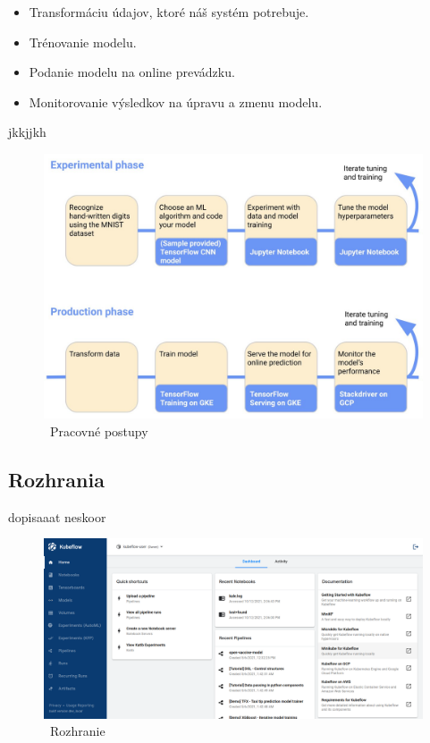 \begin{itemize}
    \item Transformáciu údajov, ktoré náš systém potrebuje.
	\item Trénovanie modelu.
	\item Podanie modelu na online prevádzku.
	\item Monitorovanie výsledkov na úpravu a zmenu modelu.
\end{itemize}
jkkjjkh
\begin{figure}[!ht]
    \includegraphics[width=.9\textwidth]{figures/kubeflowwork}
    \caption{\ Pracovné postupy \label{o:latex_friendly_zone}}
\end{figure}


\clearpage
\subsection{Rozhrania}

dopisaaat neskoor

\begin{figure}[!ht]
    \includegraphics[width=.9\textwidth]{figures/Rozhranie}
    \caption{\ Rozhranie \label{o:latex_friendly_zone}}
\end{figure}

